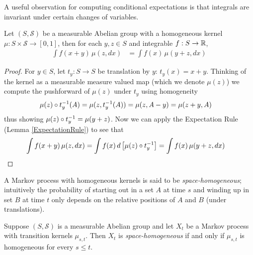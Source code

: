 A useful observation for computing conditional expectations is that
integrals are invariant under certain changes of variables.
\begin{lem}\label{HomogeneousKernelExpectationRule}Let $(S, \mathcal{S})$ be a measurable Abelian group with a
  homogeneous kernel $\mu : S \times \mathcal{S} \to [0,1]$, then for
  each $y,z \in S$ and integrable $f : S \to \reals$,
\begin{align*}
\int f(x + y) \, \mu(z, dx) &= \int f(x) \, \mu(y+z, dx)
\end{align*}
\end{lem}
\begin{proof}
For $y \in S$, let $t_y : S \to S$ be translation by $y$: $t_y(x) = x
+ y$.  Thinking of the kernel as a measurable measure
valued map (which we denote $\mu(z)$) we compute the pushforward of $\mu(z)$ under $t_y$
using homogeneity
\begin{align*}
\pushforward {t_y}{\mu(z)}(A) &= \mu(z, t_y^{-1}(A)) = \mu(z, A
- y) = \mu(z+y, A)
\end{align*}
thus showing $\pushforward {t_y}{\mu(z)} = \mu(y+z)$.
Now we can apply the Expectation Rule (Lemma \ref{ExpectationRule}) to
see that 
\begin{align*}
\int f(x + y) \, \mu(z, dx) &= \int f(x) \, d\left [ \pushforward {t_y}{\mu(z)} \right] = \int f(x) \, \mu(y+z, dx)
\end{align*}
\end{proof}

A Markov process with homogeneous kernels is said to be
\emph{space-homogeneous}; intuitively the probability of starting out
in a set $A$ at time $s$ and winding up in set $B$ at time $t$ only
depends on the relative positions of $A$ and $B$ (under translations).
\begin{defn}Suppose $(S, \mathcal{S})$ is a measurable Abelian group
  and let $X_t$ be a Markov process with transition kernels
  $\mu_{s,t}$.  Then $X_t$ is \emph{space-homogeneous} if and only if
  $\mu_{s,t}$ is homogeneous for every $s \leq t$.
\end{defn}

